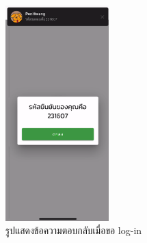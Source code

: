 \begin{figure}
  \begin{center}
    \includegraphics[width=4cm,keepaspectratio]{./images/message_login.png}
  \end{center}
  \caption[รูปแสดงข้อความตอบกลับเมื่อขอ log-in]{รูปแสดงข้อความตอบกลับเมื่อขอ log-in} 
  \label{fig:message_login}
\end{figure}